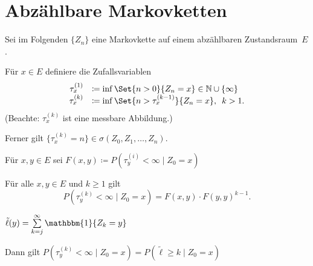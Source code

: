 \documentclass{cheat-sheet}
\newcommand{\ind}{\mathbbm{1}} %
\begin{document}
\raggedcolumns %



\section{Abzählbare Markovketten}


\begin{nota}
  Sei im Folgenden $\{ Z_n \}$ eine Markovkette auf einem abzählbaren Zustandsraum~$E$.
\end{nota}

\begin{defn}
  Für $x \in E$ definiere die Zufallsvariablen
  \[ \begin{array}{r l}
    \tau_x^{(1)} & \coloneqq \inf \Set{n > 0}{Z_n = x} \in \N \cup \{ \infty \} \\
    \tau_x^{(k)} & \coloneqq \inf \Set{n > \tau_x^{(k-1)}}{Z_n = x}, \enspace k > 1.
  \end{array} \]
  (Beachte: $\tau_x^{(k)}$ ist eine messbare Abbildung.)
\end{defn}

\begin{bem}
  Ferner gilt $\{ \tau_x^{(k)} = n \} \in \sigma(Z_0, Z_1, \ldots, Z_n)$.
\end{bem}

\begin{defn}
  Für $x, y \in E$ sei
  $F(x, y) \coloneqq P(\tau_y^{(i)} < \infty \mid Z_0 = x)$
\end{defn}

\begin{lem}
  Für alle $x, y \in E$ und $k \geq 1$ gilt
  \[ P(\tau_y^{(k)} < \infty \mid Z_0 = x) = F(x, y) \cdot F(y, y)^{k-1}. \]
\end{lem}

\begin{nota}
  $\tilde{\ell}(y) = \sum_{k=j}^\infty \ind \{ Z_k = y \}$
\end{nota}

Dann gilt $P(\tau_y^{(k)} < \infty \mid Z_0 = x) = P(\tilde{\ell} \geq k \mid Z_0 = x)$
\end{document}
